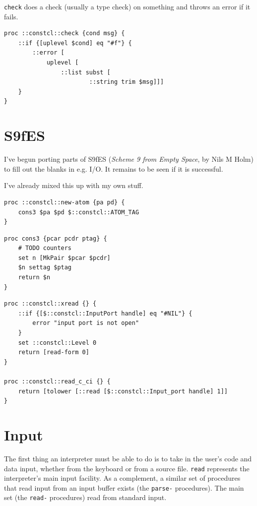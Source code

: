 \documentclass[twoside,9pt]{report}
\begin{document}
\texttt{check} does a check (usually a type check) on something and throws an error if it fails.

\noindent\makebox[\linewidth]{\rule{\linewidth}{0.4pt}}
\begin{lstlisting}
proc ::constcl::check {cond msg} {
    ::if {[uplevel $cond] eq "#f"} {
        ::error [
            uplevel [
                ::list subst [
                        ::string trim $msg]]]
    }
}
\end{lstlisting}
\noindent\makebox[\linewidth]{\rule{\linewidth}{0.4pt}}
\section{S9fES}
\label{s9fes}

I've begun porting parts of S9fES (\emph{Scheme 9 from Empty Space}, by Nils M Holm) to fill out the blanks in e.g. I/O. It remains to be seen if it is successful.


I've already mixed this up with my own stuff.

\noindent\makebox[\linewidth]{\rule{\linewidth}{0.4pt}}
\begin{lstlisting}
proc ::constcl::new-atom {pa pd} {
    cons3 $pa $pd $::constcl::ATOM_TAG
}
\end{lstlisting}
\noindent\makebox[\linewidth]{\rule{\linewidth}{0.4pt}}
\noindent\makebox[\linewidth]{\rule{\linewidth}{0.4pt}}
\begin{lstlisting}
proc cons3 {pcar pcdr ptag} {
    # TODO counters
    set n [MkPair $pcar $pcdr]
    $n settag $ptag
    return $n
}
\end{lstlisting}
\noindent\makebox[\linewidth]{\rule{\linewidth}{0.4pt}}
\noindent\makebox[\linewidth]{\rule{\linewidth}{0.4pt}}
\begin{lstlisting}
proc ::constcl::xread {} {
    ::if {[$::constcl::InputPort handle] eq "#NIL"} {
        error "input port is not open"
    }
    set ::constcl::Level 0
    return [read-form 0]
}
 
proc ::constcl::read_c_ci {} {
    return [tolower [::read [$::constcl::Input_port handle] 1]]
}
\end{lstlisting}
\noindent\makebox[\linewidth]{\rule{\linewidth}{0.4pt}}
\section{Input}
\label{input}

The first thing an interpreter must be able to do is to take in the user's code and data input, whether from the keyboard or from a source file. \texttt{read} represents the interpreter's main input facility. As a complement, a similar set of procedures that read input from an input buffer exists (the \texttt{parse-} procedures). The main set (the \texttt{read-} procedures) read from standard input.
\end{document}
